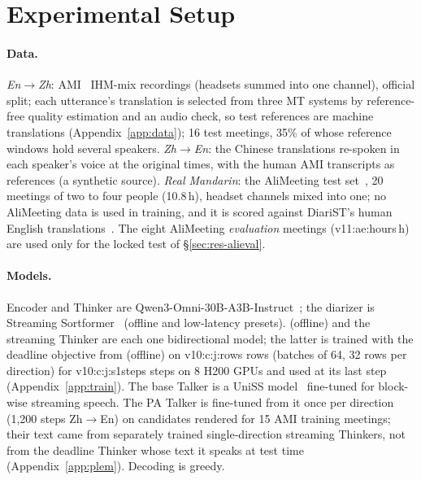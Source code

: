 \section{Experimental Setup}
\label{sec:setup}



\paragraph{Data.} \emph{En$\rightarrow$Zh}: AMI~\citep{carletta2005ami} IHM-mix recordings (headsets summed into one
channel), official split; each utterance's translation is selected from three MT systems by reference-free quality
estimation and an audio check, so test references are machine translations (Appendix~\ref{app:data}); 16 test
meetings, 35\% of whose reference windows hold several speakers. \emph{Zh$\rightarrow$En}: the Chinese translations
re-spoken in each speaker's voice at the original times, with the human AMI transcripts as references (a synthetic
source). \emph{Real Mandarin}: the AliMeeting test
set~\citep{yu2022m2met}, 20 meetings of two to four people (10.8\,h), headset channels mixed into one; no AliMeeting
data is used in training, and it is scored against DiariST's human English translations~\citep{yang2024diarist}.\ifAliEval{} The eight AliMeeting
\emph{evaluation} meetings (\num{v11:ae:hours}\,h) are used only for the locked test of \S\ref{sec:res-alieval}.\fi

\paragraph{Models.} Encoder and Thinker are Qwen3-Omni-30B-A3B-Instruct~\citep{xu2025qwen3omni}; the diarizer is
Streaming Sortformer~\citep{medennikov2025streaming} (offline and low-latency presets). \sys{} (offline) and the
streaming Thinker are each one bidirectional model; the latter is trained with the deadline objective from \sys{}
(offline) on \num{v10:c:j:rows} rows (batches of 64, 32 rows per direction) for \num{v10:c:j:s1steps} steps on 8 H200
GPUs and used at its last step (Appendix~\ref{app:train}). The base Talker is a UniSS model~\citep{uniss2025}
fine-tuned for block-wise streaming speech. The PA Talker is fine-tuned from it once per direction (1{,}200 steps
Zh$\rightarrow$En) on candidates rendered for 15 AMI training meetings; their text came from separately trained
single-direction streaming Thinkers, not from the deadline Thinker whose text it speaks at test time
(Appendix~\ref{app:plem}). Decoding is greedy.

